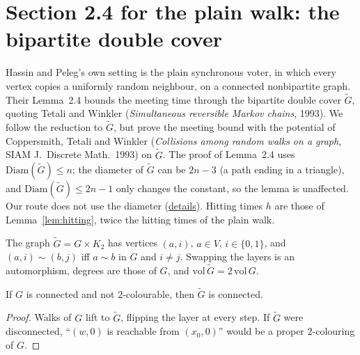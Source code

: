 \section{Section 2.4 for the plain walk: the bipartite double cover}\label{sec:hp-plain-walk}
Hassin and Peleg's own setting is the plain synchronous voter, in which every vertex copies a
uniformly random neighbour, on a connected nonbipartite graph. Their Lemma~2.4 bounds the
meeting time through the bipartite double cover $\tilde G$, quoting Tetali and Winkler
(\emph{Simultaneous reversible Markov chains}, 1993). We follow the reduction to $\tilde G$, but
prove the meeting bound with the potential of Coppersmith, Tetali and Winkler
(\emph{Collisions among random walks on a graph}, SIAM J.\ Discrete Math.\ 1993) on $\tilde G$.
The proof of Lemma~2.4 uses $\mathrm{Diam}(\tilde G)\le n$; the diameter of $\tilde G$ can be
$2n-3$ (a path ending in a triangle), and $\mathrm{Diam}(\tilde G)\le 2n-1$ only changes the
constant, so the lemma is unaffected. Our route does not use the diameter
(\href{https://github.com/formal-dynamics/leanamics/blob/main/voter/FORMALIZATION_DIFFERENCES.md#43-the-plain-walk-on-connected-nonbipartite-graphs-lemma-24-and-theorem-25}{details}).
Hitting times $h$ are those of Lemma~\ref{lem:hitting}, twice the hitting times of the plain walk.
\begin{definition}\label{def:double-cover}
\leanok{}
The graph $\tilde G=G\times K_2$ has vertices $(a,i)$, $a\in V$, $i\in\{0,1\}$, and
$(a,i)\sim(b,j)$ iff $a\sim b$ in $G$ and $i\neq j$. Swapping the layers is an automorphism,
degrees are those of $G$, and $\mathrm{vol}\,\tilde G=2\,\mathrm{vol}\,G$.
\end{definition}
\begin{lemma}\label{lem:double-cover-connected}
\leanok{}
If $G$ is connected and not $2$-colourable, then $\tilde G$ is connected.
\end{lemma}
\begin{proof}\leanok
Walks of $G$ lift to $\tilde G$, flipping the layer at every step. If $\tilde G$ were
disconnected, ``$(w,0)$ is reachable from $(x_0,0)$'' would be a proper $2$-colouring of $G$.
\end{proof}
